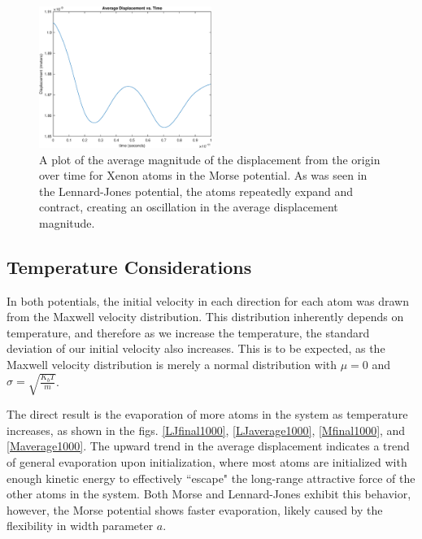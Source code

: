 \documentclass[12pt]{article}
\begin{document}
\begin{figure}
\begin{center}
\includegraphics[width=0.5\textwidth]{./finalpics/Maverager.eps}
\caption{\label{Maverager} A plot of the average magnitude of the displacement from the origin over time for Xenon atoms in the Morse potential.  As was seen in the Lennard-Jones potential, the atoms repeatedly expand and contract, creating an oscillation in the average displacement magnitude.}
\end{center}
\end{figure}

\subsection*{Temperature Considerations}
In both potentials, the initial velocity in each direction for each atom was drawn from the Maxwell velocity distribution.  This distribution inherently depends on temperature, and therefore as we increase the temperature, the standard deviation of our initial velocity also increases.  This is to be expected, as the Maxwell velocity distribution is merely a normal distribution with $\mu = 0$ and $\sigma = \sqrt{\frac{K_bT}{m}}$.

The direct result is the evaporation of more atoms in the system as temperature increases, as shown in the figs. \ref{LJfinal1000}, \ref{LJaverage1000}, \ref{Mfinal1000}, and \ref{Maverage1000}.  The upward trend in the average displacement indicates a trend of general evaporation upon initialization, where most atoms are initialized with enough kinetic energy to effectively ``escape" the long-range attractive force of the other atoms in the system.  Both Morse and Lennard-Jones exhibit this behavior, however, the Morse potential shows faster evaporation, likely caused by the flexibility in width parameter $a$.
\end{document}
